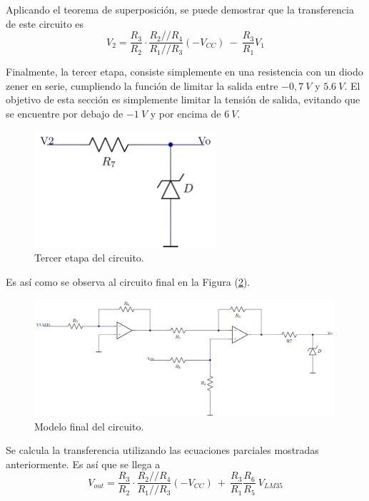 \documentclass[a4paper]{article}
\begin{document}
Aplicando el teorema de superposición, se puede demostrar que la transferencia de este circuito es
\[
	V_2 = \frac{R_3}{R_2} \cdot \frac{R_2 // R_4}{R_1 // R_3} \left( -V_{CC} \right) \ - \ \frac{R_3}{R_1} V_1
\]

Finalmente, la tercer etapa, consiste simplemente en una resistencia con un diodo zener en serie, cumpliendo la función de limitar la salida entre $-0,7 \ V$ y $5.6 \ V$. El objetivo de esta sección es simplemente limitar la tensión de salida, evitando que se encuentre por debajo de $-1 \ V$ y por encima de $6 \ V$.

\begin{figure}[H]
	\centering
	\includegraphics[width=0.6\textwidth]{Ejercicio6/Imagenes/CircuitoEtapa3-M1.png}
	\caption{Tercer etapa del circuito.}
	\label{fig:cir3}
\end{figure}

Es así como se observa al circuito final en la Figura (\ref{fig:cirfin-M1}).

\begin{figure}[H]
	\centering
	\includegraphics[width=0.99\textwidth]{Ejercicio6/Imagenes/CircuitoFinal-M1.png}
	\caption{Modelo final del circuito.}
	\label{fig:cirfin-M1}
\end{figure}

Se calcula la transferencia utilizando las ecuaciones parciales mostradas anteriormente. Es así que se llega a
\begin{equation}
	V_{out} = \frac{R_3}{R_2} \cdot \frac{R_2 // R_4}{R_1 // R_3} \left( -V_{CC} \right) \ + \
	\frac{R_3}{R_1} \frac{R_6}{R_5} \ V_{LM35}
	\label{equ:transfm1}
\end{equation}
\end{document}
